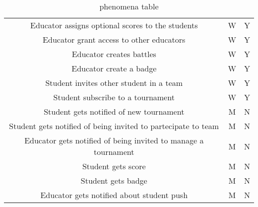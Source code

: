 \begin{center}
\begin{table}[h]
\begin{tabularx}{\textwidth}{| c| c| c|}
            Educator assigns optional scores to the students                      & W                & Y          \\
            Educator grant access to other educators                              & W                & Y          \\
            Educator creates battles                                              & W                & Y          \\
            Educator create a badge                                               & W                & Y          \\
            Student invites other student in a team                               & W                & Y          \\
            Student subscribe to a tournament                                     & W                & Y          \\
            Student gets notified of new tournament                               & M                & N          \\
            Student gets notified of being invited to partecipate to team         & M                & N          \\
            Educator gets notified of being invited to manage a tournament        & M                & N          \\
            Student gets score                                                    & M                & N          \\
            Student gets badge                                                    & M                & N          \\
            Educator gets notified about student push                             & M                & N          \\
            \hline
        \end{tabularx}
        \caption{phenomena table}
    \end{table}
\end{center}
